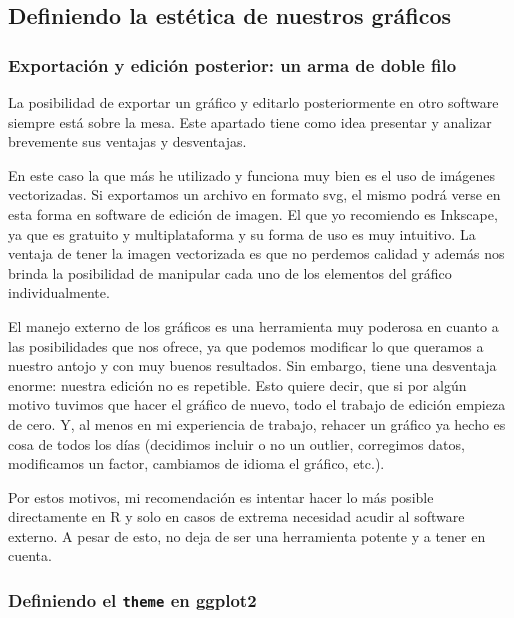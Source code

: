 \documentclass[
  letterpaper,
  DIV=11,
  numbers=noendperiod]{scrartcl}
\begin{document}
\hypertarget{definiendo-la-estuxe9tica-de-nuestros-gruxe1ficos}{%
\subsection{Definiendo la estética de nuestros
gráficos}\label{definiendo-la-estuxe9tica-de-nuestros-gruxe1ficos}}

\hypertarget{exportaciuxf3n-y-ediciuxf3n-posterior-un-arma-de-doble-filo}{%
\subsubsection{Exportación y edición posterior: un arma de doble
filo}\label{exportaciuxf3n-y-ediciuxf3n-posterior-un-arma-de-doble-filo}}

La posibilidad de exportar un gráfico y editarlo posteriormente en otro
software siempre está sobre la mesa. Este apartado tiene como idea
presentar y analizar brevemente sus ventajas y desventajas.

En este caso la que más he utilizado y funciona muy bien es el uso de
imágenes vectorizadas. Si exportamos un archivo en formato svg, el mismo
podrá verse en esta forma en software de edición de imagen. El que yo
recomiendo es Inkscape, ya que es gratuito y multiplataforma y su forma
de uso es muy intuitivo. La ventaja de tener la imagen vectorizada es
que no perdemos calidad y además nos brinda la posibilidad de manipular
cada uno de los elementos del gráfico individualmente.

El manejo externo de los gráficos es una herramienta muy poderosa en
cuanto a las posibilidades que nos ofrece, ya que podemos modificar lo
que queramos a nuestro antojo y con muy buenos resultados. Sin embargo,
tiene una desventaja enorme: nuestra edición no es repetible. Esto
quiere decir, que si por algún motivo tuvimos que hacer el gráfico de
nuevo, todo el trabajo de edición empieza de cero. Y, al menos en mi
experiencia de trabajo, rehacer un gráfico ya hecho es cosa de todos los
días (decidimos incluir o no un outlier, corregimos datos, modificamos
un factor, cambiamos de idioma el gráfico, etc.).

Por estos motivos, mi recomendación es intentar hacer lo más posible
directamente en R y solo en casos de extrema necesidad acudir al
software externo. A pesar de esto, no deja de ser una herramienta
potente y a tener en cuenta.

\hypertarget{definiendo-el-theme-en-ggplot2}{%
\subsubsection{\texorpdfstring{Definiendo el \texttt{theme} en
ggplot2}{Definiendo el theme en ggplot2}}\label{definiendo-el-theme-en-ggplot2}}
\end{document}
